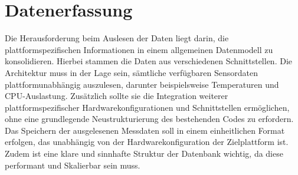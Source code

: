 \section{Datenerfassung}\label{sec:Datenerfassung}
Die Herausforderung beim Auslesen der Daten liegt darin, die plattformspezifischen Informationen in einem allgemeinen Datenmodell zu konsolidieren. Hierbei stammen die Daten aus verschiedenen Schnittstellen. Die Architektur muss in der Lage sein, sämtliche verfügbaren Sensordaten plattformunabhängig auszulesen, darunter beispielsweise Temperaturen und CPU-Auslastung. Zusätzlich sollte sie die Integration weiterer plattformspezifischer Hardwarekonfigurationen und Schnittstellen ermöglichen, ohne eine grundlegende Neustrukturierung des bestehenden Codes zu erfordern.\\
Das Speichern der ausgelesenen Messdaten soll in einem einheitlichen Format erfolgen, das unabhängig von der Hardwarekonfiguration der Zielplattform ist. Zudem ist eine klare und sinnhafte Struktur der Datenbank wichtig, da diese performant und Skalierbar sein muss.

